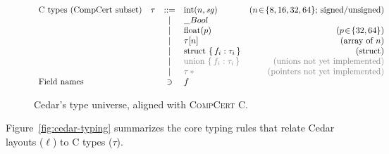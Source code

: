 \begin{figure}[h]
\[
\begin{array}{llclr}
    \textrm{C types (CompCert subset)} 
     & \tau & ::=  & \mathrm{int}(n,\mathit{sg})           & \textrm{($n\!\in\!\{8,16,32,64\}$; signed/unsigned)} \\
     &      & \mid & \_Bool                                & \\
     &      & \mid & \mathrm{float}(p)                     & \textrm{($p\!\in\!\{32,64\}$)} \\
     &      & \mid & \tau [n]                              & \textrm{(array of $n$)} \\
     &      & \mid & \mathrm{struct}\ \{\, f_i : \tau_i \,\} & \textrm{(struct)} \\
     &      & \mid & \grey{ \mathrm{union}\ \{\, f_i : \tau_i \,\} } & \textrm{\grey{(unions not yet implemented)}} \\
     &      & \mid & \grey{\tau\,{*}}                             & \textrm{\grey{(pointers not yet implemented)}} \\
  \textrm{Field names} & & \ni & f & \\
\end{array}
\]
\caption{Cedar’s type universe, aligned with \textsc{CompCert} C.}
\label{fig:cedar-types}
\end{figure}

Figure~\ref{fig:cedar-typing} summarizes the core typing rules
that relate Cedar layouts ($\ell$) to C types ($\tau$).